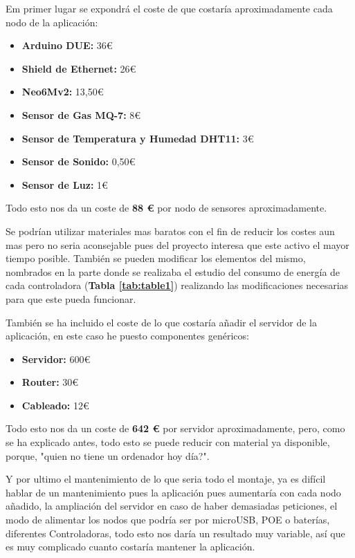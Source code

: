 Em primer lugar se expondrá el coste de que costaría aproximadamente cada nodo de la aplicación:

\begin{itemize}
	\item \textbf{Arduino DUE:} 36\euro 
	\item \textbf{Shield de Ethernet:} 26\euro 
	\item \textbf{Neo6Mv2:} 13,50\euro 
	\item \textbf{Sensor de Gas MQ-7:} 8\euro 
	\item \textbf{Sensor de Temperatura y Humedad DHT11:} 3\euro 
	\item \textbf{Sensor de Sonido:} 0,50\euro 
	\item \textbf{Sensor de Luz:} 1\euro 
\end{itemize}

Todo esto nos da un coste de \textbf{88 \euro} por nodo de sensores aproximadamente.

Se podrían utilizar materiales mas baratos con el fin de reducir los costes aun mas pero no seria aconsejable pues del proyecto interesa que este activo el mayor tiempo posible. También se pueden modificar los elementos del mismo, nombrados en la parte donde se realizaba el estudio del consumo de energía de cada controladora (\textbf{Tabla \ref{tab:table1}}) realizando las modificaciones necesarias para que este pueda funcionar.

También se ha incluido el coste de lo que costaría añadir el servidor de la aplicación, en este caso he puesto componentes genéricos:

\begin{itemize}
	\item \textbf{Servidor:} 600\euro 
	\item \textbf{Router:} 30\euro 
	\item \textbf{Cableado:} 12\euro 
\end{itemize}

Todo esto nos da un coste de \textbf{642 \euro} por servidor aproximadamente, pero, como se ha explicado antes, todo esto se puede reducir con material ya disponible, porque, "quien no tiene un ordenador hoy día?".

Y por ultimo el mantenimiento de lo que seria todo el montaje, ya es difícil hablar de un mantenimiento pues la aplicación pues aumentaría con cada nodo añadido, la ampliación del servidor en caso de haber demasiadas peticiones, el modo de alimentar los nodos que podría ser por microUSB, POE o baterías, diferentes Controladoras, todo esto nos daría un resultado muy variable, así que es muy complicado cuanto costaría mantener la aplicación.
